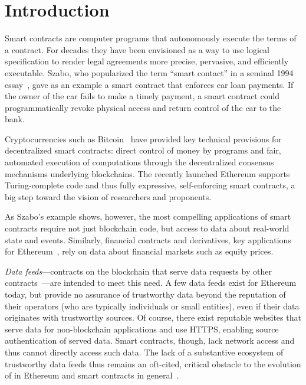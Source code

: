 \vspace{-2mm}
\section{Introduction}
\vspace{-2mm}

Smart contracts are computer programs that autonomously execute the terms of a contract.
For decades they have been envisioned as a way to use logical specification to render legal agreements more precise, pervasive, and efficiently executable.
Szabo, who popularized the term ``smart contact'' in a seminal 1994 essay~\cite{szabosmartcontract94}, gave as an example a smart contract that enforces car loan payments. If the owner of the car fails to make a timely payment, a smart contract could programmatically revoke physical access and return control of the car to the bank. %

Cryptocurrencies such as Bitcoin~\cite{bitcoin} have provided key technical provisions for decentralized smart contracts: direct control of money by programs and fair, automated execution of computations through the decentralized consensus mechanisms underlying  blockchains. 
The recently launched Ethereum supports Turing-complete code and thus fully expressive, self-enforcing smart contracts, a big step toward the vision of researchers and proponents.  

As Szabo's example shows, however, the most compelling applications of smart contracts require not just blockchain code, but access to data about real-world state and events. Similarly, financial contracts and derivatives, key applications for Ethereum~\cite{yellowpaper,whitepaper}, rely on data about financial markets such as equity prices. %

\emph{Data feeds}---contracts on the blockchain that serve data requests by other contracts~\cite{whitepaper,yellowpaper}---are intended to meet this need. A few data feeds exist for Ethereum today, but provide no assurance of trustworthy data beyond the reputation of their operators (who are typically individuals or small entities), even if their data originates with trustworthy sources. Of course, there exist reputable websites that serve data for non-blockchain applications and use HTTPS, enabling source authentication of served data. Smart contracts, though, lack network access and thus cannot directly access such data. The lack of a substantive ecosystem of trustworthy data feeds thus remains an oft-cited, critical obstacle to the evolution of in Ethereum and smart contracts 
in general~\cite{commblockstream}.

